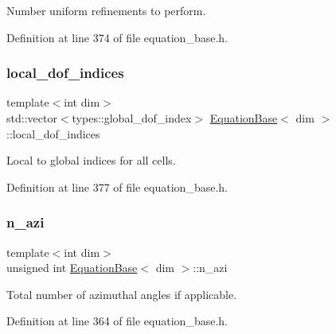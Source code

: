 Number uniform refinements to perform. 



Definition at line 374 of file equation\+\_\+base.\+h.

\mbox{\label{class_equation_base_a63c4e27465bea3cf4c2348ea7f4782c8}} 
\subsubsection{\texorpdfstring{local\+\_\+dof\+\_\+indices}{local\_dof\_indices}}
{\footnotesize\ttfamily template$<$int dim$>$ \\
std\+::vector$<$types\+::global\+\_\+dof\+\_\+index$>$ \hyperlink{class_equation_base}{Equation\+Base}$<$ dim $>$\+::local\+\_\+dof\+\_\+indices\hspace{0.3cm}{\ttfamily [protected]}}



Local to global indices for all cells. 



Definition at line 377 of file equation\+\_\+base.\+h.

\mbox{\label{class_equation_base_a006861508fc71350aee8274fd949b1e6}} 
\subsubsection{\texorpdfstring{n\+\_\+azi}{n\_azi}}
{\footnotesize\ttfamily template$<$int dim$>$ \\
unsigned int \hyperlink{class_equation_base}{Equation\+Base}$<$ dim $>$\+::n\+\_\+azi\hspace{0.3cm}{\ttfamily [protected]}}



Total number of azimuthal angles if applicable. 



Definition at line 364 of file equation\+\_\+base.\+h.

\mbox{\label{class_equation_base_a7f01312245816bc60e1cf0a1630030a2}} 
